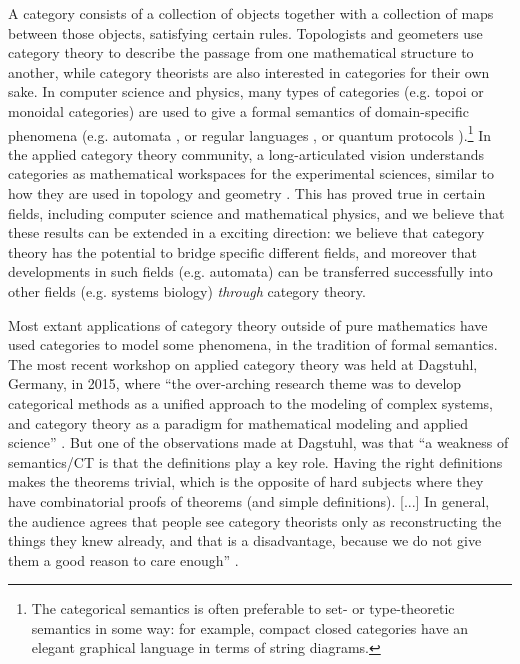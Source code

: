 \documentclass{article}
\begin{document}
A category consists of a collection of objects together with a collection of maps between those objects, satisfying certain rules. Topologists and geometers use category theory to describe the passage from one mathematical structure to another, while category theorists are also interested in categories for their own sake. In computer science and physics, many types of categories (e.g. topoi or monoidal categories) are used to give a formal semantics of domain-specific phenomena (e.g. automata \cite{arbib05}, or regular languages \cite{pippenger97}, or quantum protocols \cite{abramsky09}).\footnote{The categorical semantics is often preferable to set- or type-theoretic semantics in some way: for example, compact closed categories have an elegant graphical language in terms of string diagrams.} In the applied category theory community, a long-articulated vision understands categories as mathematical workspaces for the experimental sciences, similar to how they are used in topology and geometry \cite{spivak}. This has proved true in certain fields, including computer science and mathematical physics, and we believe that these results can be extended in a exciting direction: we believe that category theory has the potential to bridge specific different fields, and moreover that developments in such fields (e.g. automata) can be transferred successfully into other fields (e.g. systems biology) \emph{through} category theory.

Most extant applications of category theory outside of pure mathematics have used categories to model some phenomena, in the tradition of formal semantics. The most recent workshop on applied category theory was held at Dagstuhl, Germany, in 2015, where ``the over-arching research theme was to develop categorical methods as a unified approach to the modeling of complex systems, and category theory as a paradigm for mathematical modeling and applied science'' \cite{dagstuhl14}. But one of the observations made at Dagstuhl, was that ``a weakness of semantics/CT is that the definitions play a key role. Having the right definitions makes the theorems trivial, which is the opposite of hard subjects where they have combinatorial proofs of theorems (and simple definitions). [...] In general, the audience agrees that people see category theorists only as reconstructing the things they knew already, and that is a disadvantage, because we do not give them a good reason to care enough'' \cite[pg. 61]{dagstuhl14}.
\end{document}
